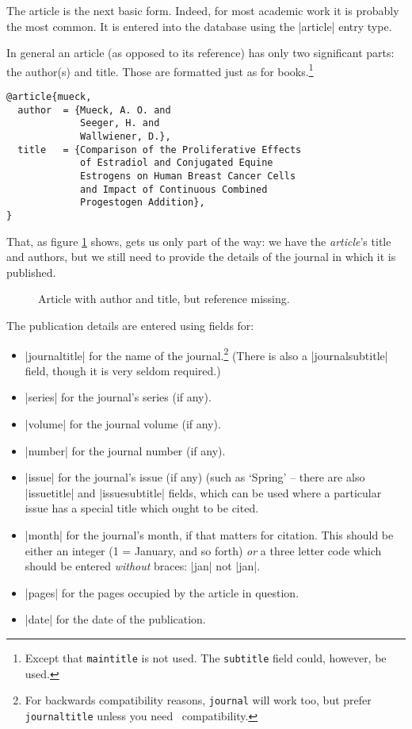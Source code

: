 The article is the next basic form. Indeed, for most academic work it
is probably the most common. It is entered into the database using the
|article| entry type.

In general an article (as opposed to its reference) has only two
significant parts: the author(s) and title. Those are formatted just
as for books.\footnote{Except that \texttt{maintitle} is not used. The
  \texttt{subtitle} field could, however, be used.}
\begin{Verbatim}
@article{mueck,
  author  = {Mueck, A. O. and
             Seeger, H. and
             Wallwiener, D.},
  title   = {Comparison of the Proliferative Effects
             of Estradiol and Conjugated Equine
             Estrogens on Human Breast Cancer Cells
             and Impact of Continuous Combined
             Progestogen Addition},
}
\end{Verbatim}

That, as figure \ref{mueck} shows, gets us only part of the way: we
have the \emph{article}'s title and authors, but we still need to
provide the details of the journal in which it is published.

\begin{figure}
\caption{Article with author and title, but reference missing.\label{mueck}}
\end{figure}

The publication details are entered using fields for:
\begin{itemize}
\item |journaltitle| for the name of the journal.\footnote{For
    backwards compatibility reasons, \texttt{journal} will work too,
    but prefer \texttt{journaltitle} unless you need \bibtex\
    compatibility.} (There is also a |journalsubtitle| field, though
  it is very seldom required.)
\item |series| for the journal's series (if any).
\item |volume| for the journal volume (if any).
\item |number| for the journal number (if any).
\item |issue| for the journal's issue (if any) (such as `Spring' --
  there are also |issuetitle| and |issuesubtitle| fields, which can be
  used where a particular issue has a special title which ought to be
  cited.
\item |month| for the journal's month, if that matters for
  citation. This should be either an integer (1 = January, and so
  forth) \emph{or} a three letter code which should be entered
  \emph{without} braces: |jan| not |{jan}|.
\item |pages| for the pages occupied by the article in question.
\item |date| for the date of the publication.
\end{itemize}

